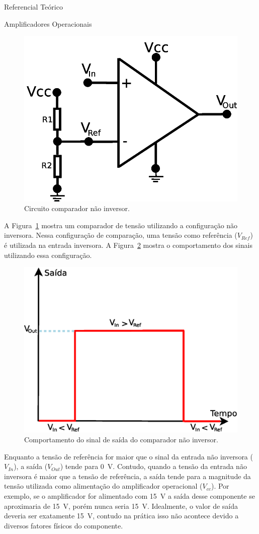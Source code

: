 \begin{chapter}{Referencial Teórico}
\begin{section}{Amplificadores Operacionais}
\begin{figure}[!h]
	\centering
	\begin{minipage}[c]{\textwidth}
	\centering
	\includegraphics[width=0.55\linewidth]{fig/nao_inversor}
	\caption{Circuito comparador não inversor.}
	\label{fig:comparador1}
	\end{minipage}
\end{figure}

A Figura~\ref{fig:comparador1} mostra um comparador de tensão utilizando a
configuração não inversora. Nessa configuração de comparação, uma tensão como
referência ($V_{Ref}$) é utilizada na entrada inversora. A
Figura~\ref{fig:sinal1} mostra o comportamento dos sinais utilizando essa
configuração.

\begin{figure}[!h]
	\centering
	\begin{minipage}[c]{\textwidth}
	\centering
	\includegraphics[width=0.5\linewidth]{fig/comparador_nao_inversor}
	\caption{Comportamento do sinal de saída do comparador não inversor.}
	\label{fig:sinal1}
	\end{minipage}
\end{figure}

Enquanto a tensão de referência for maior que o sinal da entrada não inversora
($V_{In}$), a saída ($V_{Out}$) tende para 0~V. Contudo, quando a tensão da
entrada não inversora é maior que a tensão de referência, a saída  tende para a
magnitude da tensão utilizada como alimentação do amplificador operacional
($V_{cc}$). Por exemplo, se o amplificador for alimentado com 15~V a saída desse
componente se aproximaria de 15~V, porém nunca seria 15~V. Idealmente, o valor
de saída deveria ser exatamente 15~V, contudo na prática isso não
acontece devido a diversos fatores físicos do componente.


\end{section}
\end{chapter}
